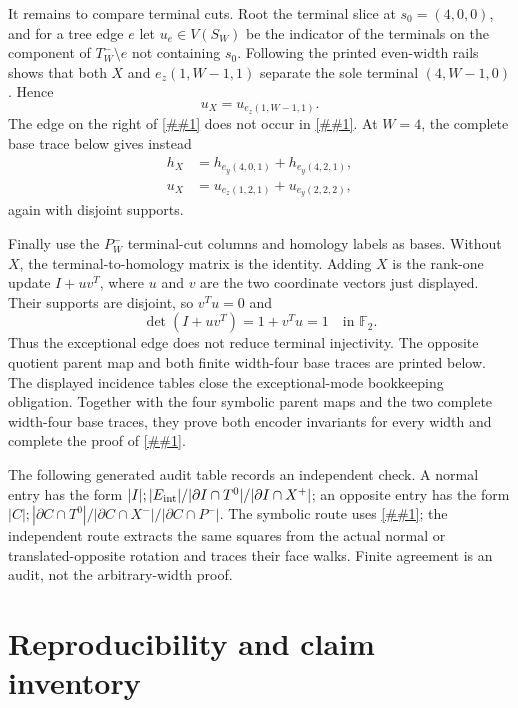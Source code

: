 \documentclass[11pt]{article}
\newcommand{\cref}[1]{\autoref{##1}}%
\newcommand{\Ftwo}{\mathbb F_2}
\begin{document}
It remains to compare terminal cuts.  Root the terminal slice at
\(s_0=(4,0,0)\), and for a tree edge \(e\) let \(u_e\in V(S_W)\) be the
indicator of the terminals on the component of \(T_W^-\setminus e\) not
containing \(s_0\).  Following the printed even-width rails shows that both
\(X\) and \(e_z(1,W-1,1)\) separate the sole terminal \((4,W-1,0)\).  Hence
\begin{equation}\label{eq:opposite-u-relation}
 u_X=u_{e_z(1,W-1,1)}.
\end{equation}
The edge on the right of \cref{eq:opposite-u-relation} does not occur in
\cref{eq:opposite-h-relation}.  At \(W=4\), the complete base trace below
gives instead
\begin{align*}
 h_X&=h_{e_y(4,0,1)}+h_{e_y(4,2,1)},\\
 u_X&=u_{e_z(1,2,1)}+u_{e_y(2,2,2)},
\end{align*}
again with disjoint supports.

Finally use the \(P_W^-\) terminal-cut columns and homology labels as bases.
Without \(X\), the terminal-to-homology matrix is the identity.  Adding
\(X\) is the rank-one update \(I+uv^T\), where \(u\) and \(v\) are the two
coordinate vectors just displayed.  Their supports are disjoint, so
\(v^Tu=0\) and
\[
 \det(I+uv^T)=1+v^Tu=1\quad\text{in }\Ftwo.
\]
Thus the exceptional edge does not reduce terminal injectivity.  The
opposite quotient parent map and both finite width-four base traces are
printed below.  The displayed incidence tables close the exceptional-mode
bookkeeping obligation.  Together with the four symbolic parent maps and the
two complete width-four base traces, they prove both encoder invariants for
every width and complete the proof of \cref{lem:encoders}.

The following generated audit table records an independent check.  A
normal entry has the form
\(|I|;|E_{\rm int}|/|\partial I\cap T^0|/|\partial I\cap X^+|\); an
opposite entry has the form
\(|C|;|\partial C\cap T^0|/|\partial C\cap X^-|/
|\partial C\cap P^-|\).  The symbolic route uses
\cref{eq:square-cellular-boundary}; the independent route extracts the same
squares from the actual normal or translated-opposite rotation and traces
their face walks.  Finite agreement is an audit, not the arbitrary-width
proof.





\clearpage
\section{Reproducibility and claim inventory}
\end{document}
